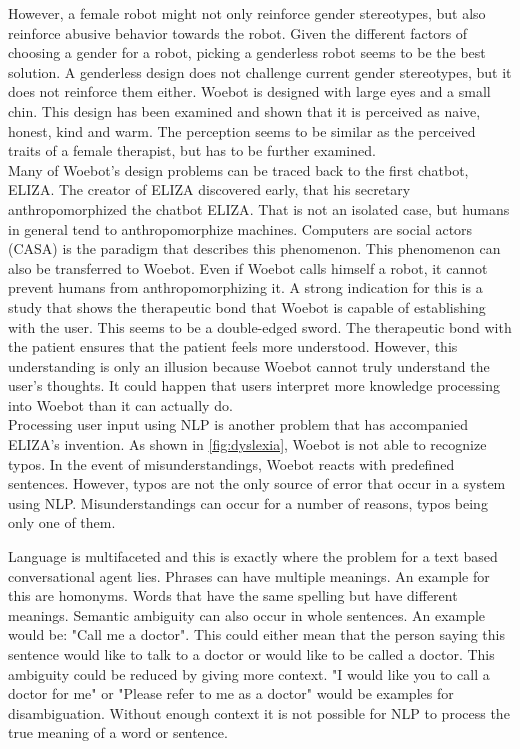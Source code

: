 However, a female robot might not only reinforce gender stereotypes, but also reinforce abusive behavior towards the robot\cite{nomura-robot, visual-gender}.
Given the different factors of choosing a gender for a robot, picking a genderless robot seems to be the best solution.
A genderless design does not challenge current gender stereotypes, but it does not reinforce them either.
Woebot is designed with large eyes and a small chin.
This design has been examined and shown that it is perceived as naive, honest, kind and warm\cite{robot-design}.
The perception seems to be similar as the perceived traits of a female therapist, but has to be further examined.\\

Many of Woebot's design problems can be traced back to the first chatbot, ELIZA.
The creator of ELIZA discovered early, that his secretary anthropomorphized the chatbot ELIZA\cite{eliza-chatbot}.
That is not an isolated case, but humans in general tend to anthropomorphize machines.
Computers are social actors (CASA) is the paradigm that describes this phenomenon\cite{casa-first, people-computers}.
This phenomenon can also be transferred to Woebot.
Even if Woebot calls himself a robot, it cannot prevent humans from anthropomorphizing it.
A strong indication for this is a study that shows the therapeutic bond that Woebot is capable of establishing with the user\cite{therapeutic-bond}.
This seems to be a double-edged sword.
The therapeutic bond with the patient ensures that the patient feels more understood.
However, this understanding is only an illusion because Woebot cannot truly understand the user's thoughts.
It could happen that users interpret more knowledge processing into Woebot than it can actually do.\\

Processing user input using NLP is another problem that has accompanied ELIZA's invention.
As shown in \autoref{fig:dyslexia}, Woebot is not able to recognize typos.
In the event of misunderstandings, Woebot reacts with predefined sentences.
However, typos are not the only source of error that occur in a system using NLP.
Misunderstandings can occur for a number of reasons, typos being only one of them.

Language is multifaceted and this is exactly where the problem for a text based conversational agent lies.
Phrases can have multiple meanings.
An example for this are homonyms.
Words that have the same spelling but have different meanings.
Semantic ambiguity can also occur in whole sentences.
An example would be: "Call me a doctor".
This could either mean that the person saying this sentence would like to talk to a doctor or would like to be called a doctor.
This ambiguity could be reduced by giving more context.
"I would like you to call a doctor for me" or "Please refer to me as a doctor" would be examples for disambiguation.
Without enough context it is not possible for NLP to process the true meaning of a word or sentence.\\

